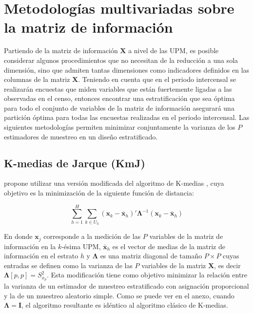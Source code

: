 \documentclass[
  10pt,
  spanish,
]{book}
\begin{document}
\hypertarget{metodologuxedas-multivariadas-sobre-la-matriz-de-informaciuxf3n}{%
\section{Metodologías multivariadas sobre la matriz de información}\label{metodologuxedas-multivariadas-sobre-la-matriz-de-informaciuxf3n}}

Partiendo de la matriz de información \(\mathbf{X}\) a nivel de las UPM, es posible considerar algunos procedimientos que no necesitan de la reducción a una sola dimensión, sino que admiten tantas dimensiones como indicadores definidos en las columnas de la matriz \(\mathbf{X}\). Teniendo en cuenta que en el periodo intercensal se realizarán encuestas que miden variables que están fuertemente ligadas a las observadas en el censo, entonces encontrar una estratificación que sea óptima para todo el conjunto de variables de la matriz de información asegurará una partición óptima para todas las encuestas realizadas en el periodo intercensal. Las siguientes metodologías permiten minimizar conjuntamente la varianza de los \(P\) estimadores de muestreo en un diseño estratificado.

\hypertarget{k-medias-de-jarque-kmj}{%
\subsection*{K-medias de Jarque (KmJ)}\label{k-medias-de-jarque-kmj}}

\citet{Jarque_1981} propone utilizar una versión modificada del algoritmo de K-medias \citep{Macqueen_1967}, cuya objetivo es la minimización de la siguiente función de distancia:

\[
\sum_{h=1}^H \sum_{k\in U_h}(\mathbf x_k - \bar {\mathbf x}_h)'\boldsymbol \Lambda^{-1}(\mathbf x_k - \bar {\mathbf x}_h)
\]

En donde \(\mathbf x_j\) corresponde a la medición de las \(P\) variables de la matriz de información en la \(k\)-ésima UPM, \(\bar {\mathbf x}_h\) es el vector de medias de la matriz de información en el estrato \(h\) y \(\boldsymbol \Lambda\) es una matriz diagonal de tamaño \(P \times P\) cuyas entradas se definen como la varianza de las \(P\) variables de la matriz \(\mathbf X\), es decir \(\boldsymbol \Lambda [p,p]=S^2_{x_p}\). Esta modificación tiene como objetivo minimizar la relación entre la varianza de un estimador de muestreo estratificado con asignación proporcional y la de un muestreo aleatorio simple. Como se puede ver en el anexo, cuando \(\boldsymbol \Lambda = \mathbf I\), el algoritmo resultante es idéntico al algoritmo clásico de K-medias.
\end{document}
